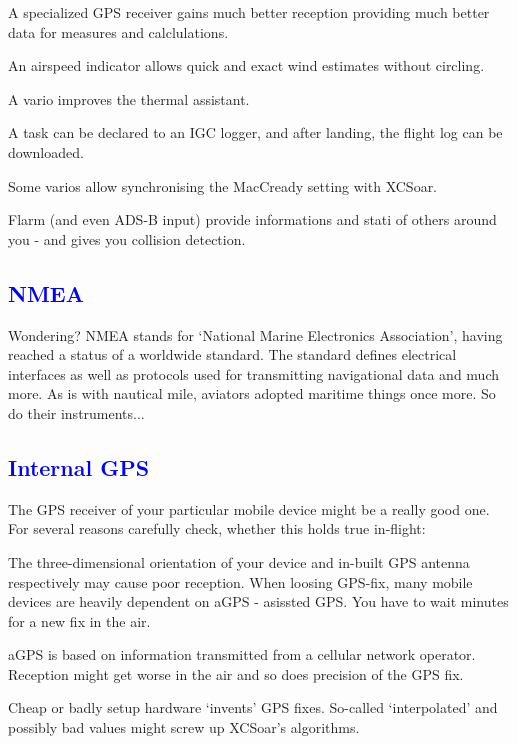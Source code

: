 \documentclass[english,a4paper,12pt,utf8]{scrreprt}
\begin{document}
\begin{compactitem}
\item A specialized GPS receiver gains much better reception providing much 
better data for measures and calclulations.
\item An airspeed indicator allows quick and exact wind estimates without 
circling.
\item A vario improves the thermal assistant.
\item A task can be declared to an IGC logger, and after landing, the 
flight log can be downloaded.
\item Some varios allow synchronising the MacCready setting with XCSoar.
\item Flarm (and even ADS-B input) provide informations and stati of others 
around you - and gives you collision detection.
\end{compactitem}

\subsection*{\textcolor{blue}{NMEA}}
Wondering?  NMEA stands for `National Marine Electronics Association', having 
reached a status of a worldwide standard. The standard defines electrical 
interfaces as well as protocols used for transmitting navigational data and 
much more. As is with nautical mile, aviators adopted maritime things once 
more. So do their instruments...

\subsection*{\textcolor{blue}{Internal GPS}}
The GPS receiver of your particular mobile device might be a really good one. 
For several reasons carefully check, whether this holds true in-flight:

\begin{compactitem}
\item The three-dimensional orientation of your device and in-built GPS 
antenna respectively may cause poor reception.  When loosing GPS-fix, many 
mobile devices are heavily dependent on aGPS - asissted GPS.  You have to wait 
minutes for a new fix in the air.
\item aGPS is based on information transmitted from a cellular network 
operator. Reception might get worse in the air and so does precision of the 
GPS fix.
\item Cheap or badly setup hardware `invents' GPS fixes. So-called 
`interpolated' and possibly bad values might screw up XCSoar's algorithms.
\end{compactitem}
\end{document}
